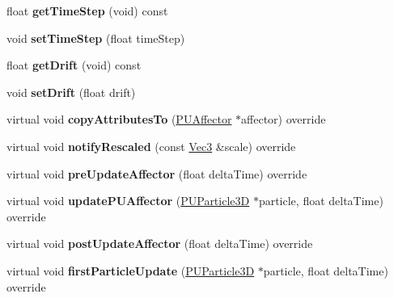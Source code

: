 \begin{DoxyCompactItemize}
\item 
\mbox{\label{classPULineAffector_ab18f28512bc10cd79b909c48394772ad}} 
float {\bfseries get\+Time\+Step} (void) const
\item 
\mbox{\label{classPULineAffector_ae60038a786cdf8d1baf3d7062deeb292}} 
void {\bfseries set\+Time\+Step} (float time\+Step)
\item 
\mbox{\label{classPULineAffector_a43938e1f0151fbd10a18d8302efde8ae}} 
float {\bfseries get\+Drift} (void) const
\item 
\mbox{\label{classPULineAffector_acf83a6c5cd1cd821cf556e22ec457c8c}} 
void {\bfseries set\+Drift} (float drift)
\item 
\mbox{\label{classPULineAffector_aa655e5a518a83519a614fd73b788fd50}} 
virtual void {\bfseries copy\+Attributes\+To} (\hyperlink{classPUAffector}{P\+U\+Affector} $\ast$affector) override
\item 
\mbox{\label{classPULineAffector_a0c2ce58da248d9e36cc004c0e57c8f28}} 
virtual void {\bfseries notify\+Rescaled} (const \hyperlink{classVec3}{Vec3} \&scale) override
\item 
\mbox{\label{classPULineAffector_a7d1e1139e286d8fcde1a6018bd3a6d5b}} 
virtual void {\bfseries pre\+Update\+Affector} (float delta\+Time) override
\item 
\mbox{\label{classPULineAffector_aea48e80dd01a459b5c200dfc7b664e42}} 
virtual void {\bfseries update\+P\+U\+Affector} (\hyperlink{structPUParticle3D}{P\+U\+Particle3D} $\ast$particle, float delta\+Time) override
\item 
\mbox{\label{classPULineAffector_ac30cb40f24b06cfc6b651cc12dd95d34}} 
virtual void {\bfseries post\+Update\+Affector} (float delta\+Time) override
\item 
\mbox{\label{classPULineAffector_aea614f72e8fcb8b3f85885b46f37ba22}} 
virtual void {\bfseries first\+Particle\+Update} (\hyperlink{structPUParticle3D}{P\+U\+Particle3D} $\ast$particle, float delta\+Time) override

\end{DoxyCompactItemize}
